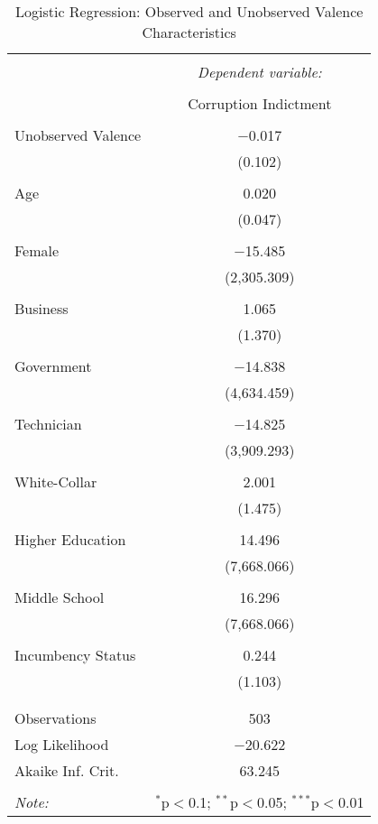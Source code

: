 \documentclass{article}
\begin{document}
\begin{table}[!htbp] \centering 
  \caption{Logistic Regression: Observed and Unobserved Valence Characteristics} 
  \label{} 
\begin{tabular}{@{\extracolsep{5pt}}lc} 
\\[-1.8ex]\hline 
\hline \\[-1.8ex] 
 & \multicolumn{1}{c}{\textit{Dependent variable:}} \\ 
\cline{2-2} 
\\[-1.8ex] & Corruption Indictment \\ 
\hline \\[-1.8ex] 
 Unobserved Valence & $-$0.017 \\ 
  & (0.102) \\ 
  & \\ 
 Age & 0.020 \\ 
  & (0.047) \\ 
  & \\ 
 Female & $-$15.485 \\ 
  & (2,305.309) \\ 
  & \\ 
 Business & 1.065 \\ 
  & (1.370) \\ 
  & \\ 
 Government & $-$14.838 \\ 
  & (4,634.459) \\ 
  & \\ 
 Technician & $-$14.825 \\ 
  & (3,909.293) \\ 
  & \\ 
 White-Collar & 2.001 \\ 
  & (1.475) \\ 
  & \\ 
 Higher Education & 14.496 \\ 
  & (7,668.066) \\ 
  & \\ 
 Middle School & 16.296 \\ 
  & (7,668.066) \\ 
  & \\ 
 Incumbency Status & 0.244 \\ 
  & (1.103) \\ 
  & \\ 
\hline \\[-1.8ex] 
Observations & 503 \\ 
Log Likelihood & $-$20.622 \\ 
Akaike Inf. Crit. & 63.245 \\ 
\hline 
\hline \\[-1.8ex] 
\textit{Note:}  & \multicolumn{1}{r}{$^{*}$p$<$0.1; $^{**}$p$<$0.05; $^{***}$p$<$0.01} \\ 
\end{tabular} 
\end{table} 
\end{document}

